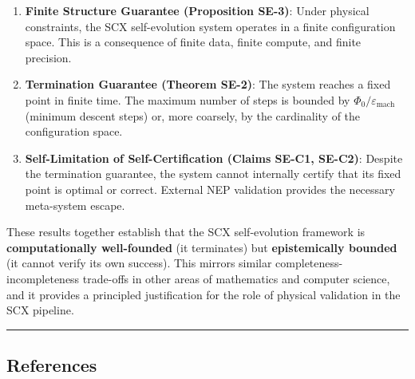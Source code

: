 \documentclass[
  12pt,
]{article}
\begin{document}
\begin{enumerate}
\def\labelenumi{\arabic{enumi}.}
\item
  \textbf{Finite Structure Guarantee (Proposition SE-3)}: Under physical
  constraints, the SCX self-evolution system operates in a finite
  configuration space. This is a consequence of finite data, finite
  compute, and finite precision.
\item
  \textbf{Termination Guarantee (Theorem SE-2)}: The system reaches a
  fixed point in finite time. The maximum number of steps is bounded by
  \(\Phi_0/\varepsilon_{\text{mach}}\) (minimum descent steps) or, more
  coarsely, by the cardinality of the configuration space.
\item
  \textbf{Self-Limitation of Self-Certification (Claims SE-C1, SE-C2)}:
  Despite the termination guarantee, the system cannot internally
  certify that its fixed point is optimal or correct. External NEP
  validation provides the necessary meta-system escape.
\end{enumerate}

These results together establish that the SCX self-evolution framework
is \textbf{computationally well-founded} (it terminates) but
\textbf{epistemically bounded} (it cannot verify its own success). This
mirrors similar completeness-incompleteness trade-offs in other areas of
mathematics and computer science, and it provides a principled
justification for the role of physical validation in the SCX pipeline.

\begin{center}\rule{0.5\linewidth}{0.5pt}\end{center}

\subsection{References}\label{references}
\end{document}
